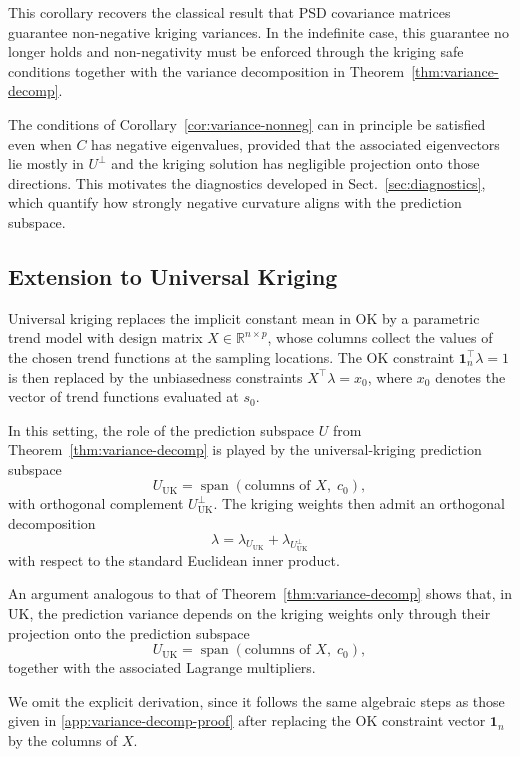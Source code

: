 \documentclass[smallextended]{svjour3}
\newcommand{\1}{\mathbf{1}}
\begin{document}
This corollary recovers the classical result that PSD covariance matrices guarantee non-negative kriging variances. In the indefinite case, this guarantee no longer holds and non-negativity must be enforced through the kriging safe conditions together with the variance decomposition in Theorem~\ref{thm:variance-decomp}.

The conditions of Corollary~\ref{cor:variance-nonneg} can in principle be satisfied even when $C$ has negative eigenvalues, provided that the associated eigenvectors lie mostly in $U^{\perp}$ and the kriging solution has negligible projection onto those directions. This motivates the diagnostics developed in Sect.~\ref{sec:diagnostics}, which quantify how strongly negative curvature aligns with the prediction subspace.

\subsection{Extension to Universal Kriging}
\label{subsec:universal-kriging}
 
Universal kriging replaces the implicit constant mean in OK by a parametric trend model with design matrix $X \in \mathbb{R}^{n \times p}$, whose columns collect the values of the chosen trend functions at the sampling locations. The OK constraint $\1_n^\top \lambda = 1$ is then replaced by the unbiasedness constraints $X^\top \lambda = x_0$, where $x_0$ denotes the vector of trend functions evaluated at $s_0$.

In this setting, the role of the prediction subspace $U$ from Theorem~\ref{thm:variance-decomp} is played by the universal-kriging prediction subspace
\[
U_{\mathrm{UK}} = \operatorname{span}(\text{columns of } X,\; c_0),
\]
with orthogonal complement $U_{\mathrm{UK}}^\perp$. The kriging weights then admit an orthogonal decomposition
\[
\lambda = \lambda_{U_{\mathrm{UK}}} + \lambda_{U_{\mathrm{UK}}^\perp}
\]
with respect to the standard Euclidean inner product.

An argument analogous to that of Theorem~\ref{thm:variance-decomp} shows that, in UK, the prediction variance depends on the kriging weights only through their projection onto the prediction subspace
\[
U_{\mathrm{UK}}
=
\operatorname{span}(\text{columns of }X,\;c_0),
\]
together with the associated Lagrange multipliers.

We omit the explicit derivation, since it follows the same algebraic steps as those given in \ref{app:variance-decomp-proof} after replacing the OK constraint vector $\mathbf{1}_n$ by the
columns of $X$.
\end{document}
